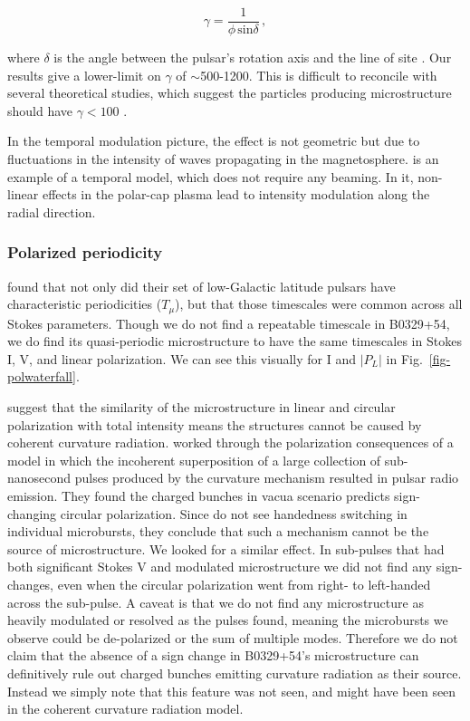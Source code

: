 \begin{equation}
\gamma = \frac{1}{\phi\, \textrm{sin}\delta}\,,
\end{equation}

\noindent where $\delta$ is the angle between 
the pulsar's rotation axis and the line of site \citep{1998A&A...332..111L}.
Our results give a lower-limit on $\gamma$ of 
$\sim$500-1200. This is difficult to reconcile 
with several theoretical studies, which suggest 
the particles producing microstructure should have
$\gamma<100$ \citep{1992msem.coll..322A, 1998A&A...332..111L}.

In the temporal modulation picture, the effect
is not geometric but due to fluctuations in 
the intensity of waves propagating in the magnetosphere.
\citet{1983Ap&SS..97....9C} is an example of a temporal model, which 
does not require any beaming. In it, non-linear effects 
in the polar-cap plasma lead to intensity modulation 
along the radial direction.

\subsubsection{Polarized periodicity}

\citet{2015ApJ...806..236M} found that not only did 
their set of low-Galactic latitude pulsars 
have characteristic periodicities ($T_\mu$), but that 
those timescales were common across all Stokes 
parameters. Though we do not find a repeatable 
timescale in B0329+54, we do find its 
quasi-periodic microstructure to have the same 
timescales in Stokes I, V, and linear polarization.
We can see this visually 
for I and $|P_L|$ in Fig.~\ref{fig-polwaterfall}.

\citet{2015ApJ...806..236M} suggest that the similarity of 
the microstructure in 
linear and circular polarization with total intensity 
means the structures cannot be 
caused by coherent curvature radiation. 
\citet{1990A&A...234..269G} worked through the 
polarization consequences of a model 
in which the incoherent superposition of a large 
collection of sub-nanosecond pulses produced 
by the curvature mechanism resulted in pulsar radio emission.
They found the charged bunches in vacua scenario predicts
sign-changing circular polarization. Since 
\citet{2015ApJ...806..236M} do not see 
handedness switching in individual microbursts, they conclude 
that such a mechanism cannot be the source of microstructure.  
We looked for a similar effect. In sub-pulses that had both significant 
Stokes V and modulated microstructure we did not find any sign-changes, 
even when the circular polarization went from right- to left-handed
across the sub-pulse. A caveat is that we do not find any 
microstructure as heavily modulated or resolved as the pulses 
\citet{2015ApJ...806..236M} found, meaning the microbursts 
we observe could be de-polarized or the sum of multiple 
modes. Therefore we do not claim that the 
absence of a sign change in B0329+54's microstructure 
can definitively rule out charged bunches emitting 
curvature radiation as their source. Instead we simply note 
that this feature was not seen, and might have been seen 
in the coherent curvature radiation model.



